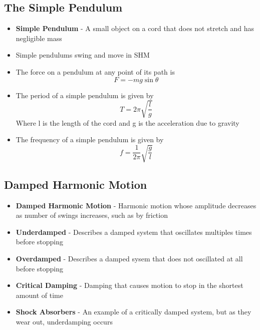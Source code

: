 \subsection{The Simple Pendulum}
\begin{itemize}
    \item \textbf{Simple Pendulum} - A small object on a cord that does not stretch and has negligible mass
    \item Simple pendulums swing and move in SHM
    \item The force on a pendulum  at any point of its path is \[F=-mg\sin\theta\]
    \item The period of a simple pendulum is given by \[T=2\pi\sqrt{\frac{l}{g}}\] Where l is the length of the cord and g is the acceleration due to gravity
    \item The frequency of a simple pendulum is given by \[f=\frac{1}{2\pi}\sqrt{\frac{g}{l}}\]
\end{itemize}

\subsection{Damped Harmonic Motion}
\begin{itemize}
    \item \textbf{Damped Harmonic Motion} - Harmonic motion whose amplitude decreases as number of swings increases, such as by friction
    \item \textbf{Underdamped} - Describes a damped system that oscillates multiples times before stopping
    \item \textbf{Overdamped} - Describes a damped sysem that does not oscillated at all before stopping
    \item \textbf{Critical Damping} - Damping that causes motion to stop in the shortest amount of time
    \item \textbf{Shock Absorbers} - An example of a critically damped system, but as they wear out, underdamping occurs
\end{itemize}

